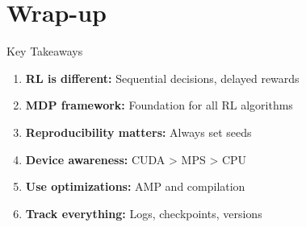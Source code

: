 \documentclass[aspectratio=169,10pt]{beamer}
\begin{document}
\section{Wrap-up}

\begin{frame}{Key Takeaways}
\begin{enumerate}
    \item \textbf{RL is different:} Sequential decisions, delayed rewards
    \item \textbf{MDP framework:} Foundation for all RL algorithms
    \item \textbf{Reproducibility matters:} Always set seeds
    \item \textbf{Device awareness:} CUDA > MPS > CPU
    \item \textbf{Use optimizations:} AMP and compilation
    \item \textbf{Track everything:} Logs, checkpoints, versions
\end{enumerate}
\end{frame}
\end{document}
